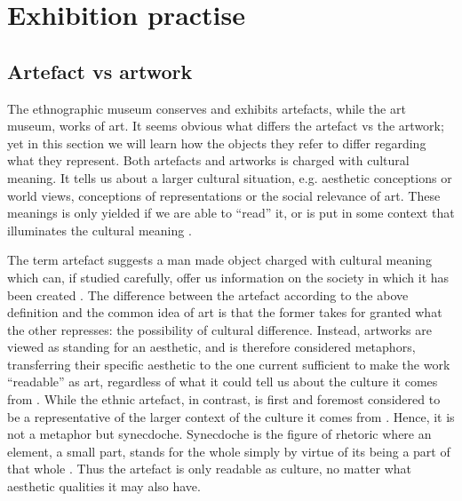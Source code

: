 \section{Exhibition practise}

\subsection{Artefact vs artwork}
The ethnographic museum conserves and exhibits artefacts, while the art museum, works of art. It seems obvious what differs the artefact vs the artwork; yet in this section we will learn how the objects they refer to differ regarding what they represent. Both artefacts and artworks is charged with cultural meaning. It tells us about a larger cultural situation, e.g. aesthetic conceptions or world views, conceptions of representations or the social relevance of art. These meanings is only yielded if we are able to “read” it, or is put in some context that illuminates the cultural meaning \autocite[p. 206]{Thi_book}.

The term artefact suggests a man made object charged with cultural meaning which can, if studied carefully, offer us information on the society in which it has been created \autocite[p. 205]{Thi_book}. The difference between the artefact according to the above definition and the common idea of art is that the former takes for granted what the other represses: the possibility of cultural difference. Instead, artworks are viewed as standing for an aesthetic, and is therefore considered metaphors, transferring their specific aesthetic to the one current sufficient to make the work “readable” as art, regardless of what it could tell us about the culture it comes from \autocite[p. 206]{Thi_book}. While the ethnic artefact, in contrast, is first and foremost considered to be a representative of the larger context of the culture it comes from \autocite[p. 206]{Thi_book}. Hence, it is not a metaphor but synecdoche. Synecdoche is the figure of rhetoric where an element, a small part, stands for the whole simply by virtue of its being a part of that whole \autocite[p. 206]{Thi_book}. Thus the artefact is only readable as culture, no matter what aesthetic qualities it may also have.


